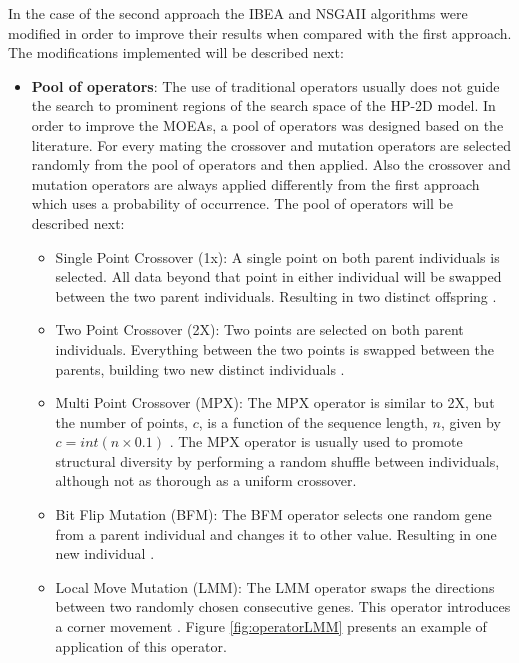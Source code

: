 In the case of the second approach the IBEA and NSGAII algorithms were modified in order to improve their results when compared with the first approach. The modifications implemented will be described next:

\begin{itemize}
	
	\item \textbf{Pool of operators}: The use of traditional operators usually does not guide the search to prominent regions of the search space of the HP-2D model. In order to improve the MOEAs, a pool of operators was designed based on the literature. For every mating the crossover and mutation operators are selected randomly from the pool of operators and then applied. Also the crossover and mutation operators are always applied differently from the first approach which uses a probability of occurrence. The pool of operators will be described next:
	
	\begin{itemize}
		\item Single Point Crossover (1x): A single point on both parent individuals is selected. All data beyond that point in either individual will be swapped between the two parent individuals. Resulting in two distinct offspring \cite{holland1975adaptation}.
		
		\item Two Point Crossover (2X): Two points are selected on both parent individuals. Everything between the two points is swapped between the parents, building two new distinct individuals \cite{holland1975adaptation}.
		
		\item Multi Point Crossover (MPX): The MPX operator is similar to 2X, but the number of points, $c$, is a function of the sequence length, $n$, given by $c = int(n \times 0.1)$ \cite{custodio2004investigation}. The MPX operator is usually used to promote structural diversity by performing a random shuffle between individuals, although not as thorough as a uniform crossover.
		
		\item Bit Flip Mutation (BFM): The BFM operator selects one random gene from a parent individual and changes it to other value. Resulting in one new individual \cite{holland1975adaptation}.
		
		\item Local Move Mutation (LMM): The LMM operator swaps the directions between two randomly chosen consecutive genes. This operator introduces a corner movement \cite{bazzoli2004memetic}. Figure \ref{fig:operatorLMM} presents an example of application of this operator.
		

\end{itemize}
\end{itemize}
